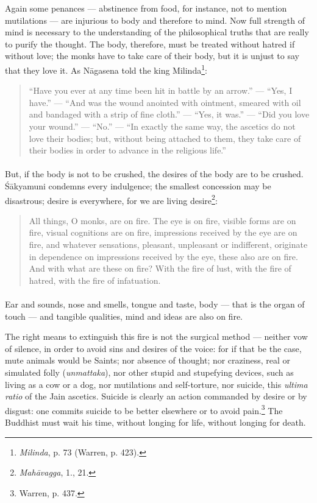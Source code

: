 \documentclass[a4paper, 11pt, oneside, english]{article}
\begin{document}
Again some penances --- abstinence from food, for instance, not to mention mutilations --- are injurious to body and therefore to mind. Now full strength of mind is necessary to the understanding of the philosophical truths that are really to purify the thought. The body, therefore, must be treated without hatred if without love; the monks have to take care of their body, but it is unjust to say that they love it. As Nāgasena told the king Milinda\footnote{\emph{Milinda}, p. 73 (Warren, p. 423).}:
\begin{quotation}
\small
``Have you ever at any time been hit in battle by an arrow.'' --- ``Yes, I have.'' --- ``And was the wound anointed with ointment, smeared with oil and bandaged with a strip of fine cloth.'' --- ``Yes, it was.'' --- ``Did you love your wound.'' --- ``No.'' --- ``In exactly the same way, the ascetics do not love their bodies; but, without being attached to them, they take care of their bodies in order to advance in the religious life.''
\end{quotation}
\paragraph{}
But, if the body is not to be crushed, the desires of the body are to be crushed. Śākyamuni condemns every indulgence; the smallest concession may be disastrous; desire is everywhere, for we are living desire\footnote{\emph{Mahāvagga}, 1., 21.}:
\begin{quotation}
\small
All things, O monks, are on fire. The eye is on fire, visible forms are on fire, visual cognitions are on fire, impressions received by the eye are on fire, and whatever sensations, pleasant, unpleasant or indifferent, originate in dependence on impressions received by the eye, these also are on fire. And with what are these on fire? With the fire of lust, with the fire of hatred, with the fire of infatuation.
\end{quotation}
\paragraph{}
Ear and sounds, nose and smells, tongue and taste, body --- that is the organ of touch --- and tangible qualities, mind and ideas are also on fire.

The right means to extinguish this fire is not the surgical method --- neither vow of silence, in order to avoid sins and desires of the voice: for if that be the case, mute animals would be Saints; nor absence of thought; nor craziness, real or simulated folly (\emph{unmattaka}), nor other stupid and stupefying devices, such as living as a cow or a dog, nor mutilations and self-torture, nor suicide, this \emph{ultima ratio} of the Jain ascetics. Suicide is clearly an action commanded by desire or by disgust: one commits suicide to be better elsewhere or to avoid pain.\footnote{Warren, p. 437.} The Buddhist must wait his time, without longing for life, without longing for death.
\end{document}

